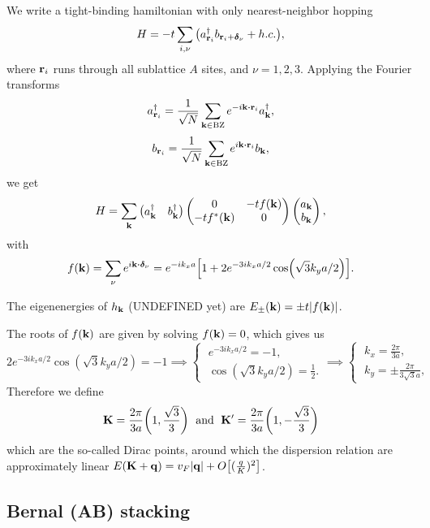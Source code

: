 \documentclass[12pt]{report}
\begin{document}
We write a tight-binding hamiltonian with only nearest-neighbor hopping
$$
H = -t \sum_{i,\nu} \qty(a^\dagger_{{\vb{r}}_i} b_{{\vb{r}}_i + \bm{\delta}_\nu} + h.c. ),
$$
where ${\vb{r}}_i$ runs through all sublattice $A$ sites, and $\nu = 1, 2, 3$. Applying the Fourier transforms
$$
a_{\r_i}^\d = \frac{1}{\sqrt{N}} \sum_{\k \in \text{BZ}} e^{-i \k \vdot \r_i} a_{\k}^\d,
$$
$$
b_{\r_i} = \frac{1}{\sqrt{N}} \sum_{\k \in \text{BZ}} e^{i \k \vdot \r_i} b_{\k},
$$
we get
$$
H = \sum_{{\vb{k}}}
\begin{pmatrix}
a_{{\vb{k}}}^\dagger & b_{{\vb{k}}}^\dagger
\end{pmatrix}
\begin{pmatrix}
0 & -t f({\vb{k}}) \\
-t f^*({\vb{k}}) & 0
\end{pmatrix}
\begin{pmatrix}
a_{{\vb{k}}} \\ b_{{\vb{k}}}
\end{pmatrix},
$$
with
$$
f(\k) = \sum_{\nu} e^{i \k \vdot \bm{\delta}_\nu} =
e^{-i k_x a} \qty[ 1 + 2 e^{-3ik_x a / 2} \cos(\sqrt{3} k_y a / 2) ].
$$

The eigenenergies of $h_{{\vb{k}}}$ (UNDEFINED yet) are $E_\pm({\vb{k}}) = \pm t \abs{f({\vb{k}})}$.

The roots of $f({\vb{k}})$ are given by solving $f({\vb{k}}) = 0$, which gives us
$$
2 e^{-3ik_x a / 2} \cos(\sqrt{3} k_y a / 2) = -1 \implies
\begin{cases}
\; e^{-3i k_x a/2} = - 1, \\
\; \cos(\sqrt{3} k_y a / 2) = \frac{1}{2}.
\end{cases}
\implies
\begin{cases}
\; k_x = \frac{2\pi}{3a}, \\
\; k_y = \pm \frac{2\pi}{3 \sqrt{3} a},
\end{cases}
$$
Therefore we define
$$
\vb{K} = \frac{2\pi}{3a} \qty(1, \frac{\sqrt{3}}{3}) \; \text{ and } \;
\vb{K}' = \frac{2\pi}{3a} \qty(1, -\frac{\sqrt{3}}{3})
$$
which are the so-called Dirac points, around which the dispersion relation are approximately linear $E(\vb{K} + {\vb{q}}) = v_F \abs{{\vb{q}}} + O\qty[(\frac{q}{K})^2]$.



\subsection{Bernal (AB) stacking} \label{sec:ab-stacking}
\end{document}
